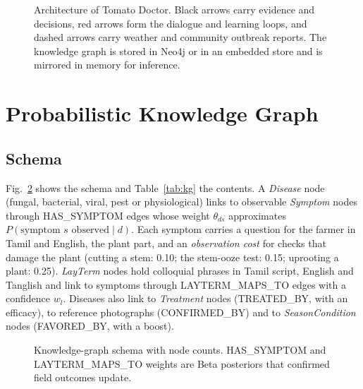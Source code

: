 \documentclass[conference]{IEEEtran}
\begin{document}
\begin{figure}[t]
  \centering
  \resizebox{\textwidth}{!}{}
  \caption{Architecture of Tomato Doctor. Black arrows carry evidence and decisions, red arrows form the dialogue and learning loops, and dashed arrows carry weather and community outbreak reports. The knowledge graph is stored in Neo4j or in an embedded store and is mirrored in memory for inference.}
  \label{fig:arch}
\end{figure}

\section{Probabilistic Knowledge Graph}
\label{sec:kg}

\subsection{Schema}
Fig.~\ref{fig:schema} shows the schema and Table~\ref{tab:kg} the contents. A \emph{Disease} node (fungal, bacterial, viral, pest or physiological) links to observable \emph{Symptom} nodes through \textsf{HAS\_SYMPTOM} edges whose weight $\theta_{ds}$ approximates $P(\text{symptom } s \text{ observed}\mid d)$. Each symptom carries a question for the farmer in Tamil and English, the plant part, and an \emph{observation cost} for checks that damage the plant (cutting a stem: 0.10; the stem-ooze test: 0.15; uprooting a plant: 0.25). \emph{LayTerm} nodes hold colloquial phrases in Tamil script, English and Tanglish and link to symptoms through \textsf{LAYTERM\_MAPS\_TO} edges with a confidence $w_l$. Diseases also link to \emph{Treatment} nodes (\textsf{TREATED\_BY}, with an efficacy), to reference photographs (\textsf{CONFIRMED\_BY}) and to \emph{SeasonCondition} nodes (\textsf{FAVORED\_BY}, with a boost).

\begin{figure}[t]
  \centering
  \resizebox{0.97\columnwidth}{!}{}
  \caption{Knowledge-graph schema with node counts. \textsf{HAS\_SYMPTOM} and \textsf{LAYTERM\_MAPS\_TO} weights are Beta posteriors that confirmed field outcomes update.}
  \label{fig:schema}
\end{figure}
\end{document}
